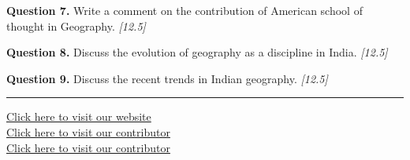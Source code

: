 \documentclass[11pt,a4paper]{article}
\newcommand{\pts}[1]{\hfill   \textit{[#1]}}
\begin{document}
\noindent   \textbf{Question 7.} Write a comment on the contribution of American school of thought in Geography. \pts{12.5}

\medskip


\noindent   \textbf{Question 8.} Discuss the evolution of geography as a discipline in India. \pts{12.5}

\medskip


\noindent   \textbf{Question 9.} Discuss the recent trends in Indian geography. \pts{12.5}

\vfill\rule{\linewidth}{0.4pt}

\begin{center}\small
\href{https://bhu-exam.vercel.app/}{Click here to visit our website}\\[4pt]
\href{https://me-aryan.vercel.app/}{Click here to visit our contributor}\\[4pt]
\href{https://quashan-me.vercel.app/}{Click here to visit our contributor}
\end{center}
\end{document}
